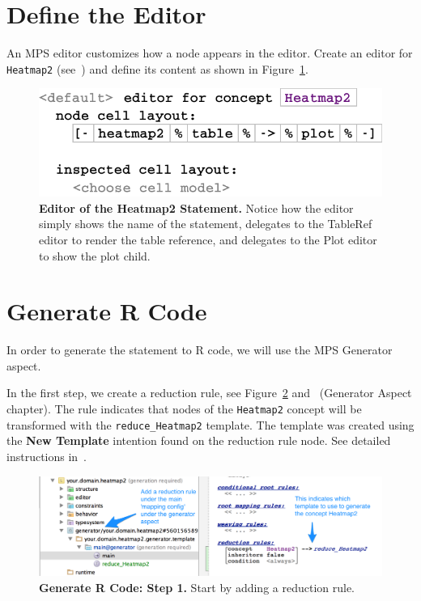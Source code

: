 \section{Define the Editor}
An MPS editor customizes how a node appears in the editor. Create an editor for \texttt{Heatmap2} (see~\cite{campagne2014mps}) and define its content as shown in Figure~\ref{fig:EditorForHeatmap2}.
\begin{figure}
  \centering
  \includegraphics[width=\figWidthNarrow]{figures/EditorForHeatmap2.pdf}
\caption[Editor of the Heatmap2 Statement.]{\textbf{Editor of the Heatmap2 Statement.} Notice how the editor simply shows the name of the statement, delegates to the TableRef editor to render the table reference, and delegates to the Plot editor to show the plot child.}
\label{fig:EditorForHeatmap2}
\end{figure}

\section{Generate R Code}
In order to generate the statement to R code, we will use the MPS Generator aspect. 

In the first step, we create a reduction rule, see Figure~\ref{fig:GeneratorHowToStep1} and~\cite{campagne2014mps} (Generator Aspect chapter). The rule indicates that nodes of the \texttt{Heatmap2} concept will be transformed with the \texttt{reduce\_Heatmap2} template. The template was created using the \textbf{New Template} intention found on the reduction rule node. See detailed instructions in~\cite{campagne2014mps}.

\begin{figure}[h!tbp]
  \centering
  \includegraphics[width=\figWidthWide]{figures/GeneratorHowToStep1.png}
\caption[Generate R Code: Step 1.]{\textbf{Generate R Code: Step 1.} Start by adding a reduction rule.}
\label{fig:GeneratorHowToStep1}
\end{figure}

